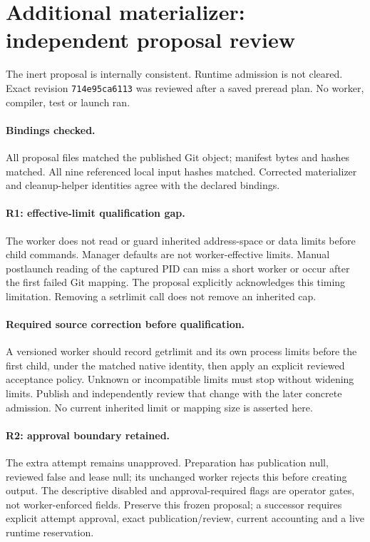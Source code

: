 \documentclass[10pt]{article}
\begin{document}
\section*{Additional materializer: independent proposal review}
The inert proposal is internally consistent. Runtime admission is not cleared. Exact revision \texttt{714e95ca6113} was reviewed after a saved preread plan. No worker, compiler, test or launch ran.
\paragraph{Bindings checked.} All proposal files matched the published Git object; manifest bytes and hashes matched. All nine referenced local input hashes matched. Corrected materializer and cleanup-helper identities agree with the declared bindings.
\paragraph{R1: effective-limit qualification gap.} The worker does not read or guard inherited address-space or data limits before child commands. Manager defaults are not worker-effective limits. Manual postlaunch reading of the captured PID can miss a short worker or occur after the first failed Git mapping. The proposal explicitly acknowledges this timing limitation. Removing a setrlimit call does not remove an inherited cap.
\paragraph{Required source correction before qualification.} A versioned worker should record getrlimit and its own process limits before the first child, under the matched native identity, then apply an explicit reviewed acceptance policy. Unknown or incompatible limits must stop without widening limits. Publish and independently review that change with the later concrete admission. No current inherited limit or mapping size is asserted here.
\paragraph{R2: approval boundary retained.} The extra attempt remains unapproved. Preparation has publication null, reviewed false and lease null; its unchanged worker rejects this before creating output. The descriptive disabled and approval-required flags are operator gates, not worker-enforced fields. Preserve this frozen proposal; a successor requires explicit attempt approval, exact publication/review, current accounting and a live runtime reservation.
\end{document}
